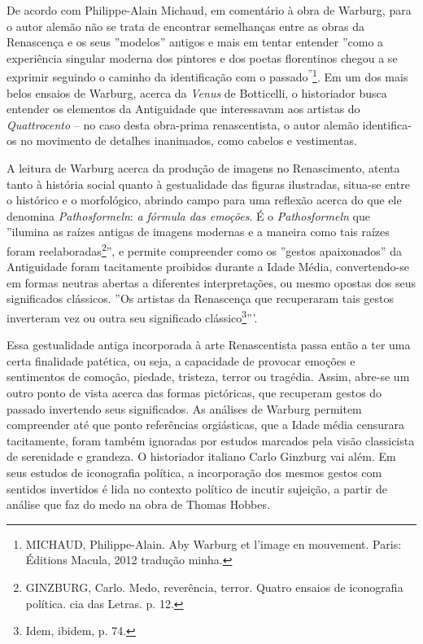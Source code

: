 De acordo com Philippe-Alain Michaud, em comentário à obra de Warburg,
para o autor alemão não se trata de encontrar semelhanças entre as obras
da Renascença e os seus ''modelos'' antigos e mais em tentar entender
''como a experiência singular moderna dos pintores e dos poetas
florentinos chegou a se exprimir seguindo o caminho da identificação com
o passado\textsuperscript{''}\footnote{MICHAUD, Philippe-Alain. Aby
  Warburg et l'image en mouvement. Paris: Éditions Macula, 2012 tradução
  minha.}. Em um dos mais belos ensaios de Warburg, acerca da
\emph{Venus} de Botticelli, o historiador busca entender os elementos da
Antiguidade que interessavam aos artistas do \emph{Quattrocento} -- no
caso desta obra-prima renascentista, o autor alemão identifica-os no
movimento de detalhes inanimados, como cabelos e vestimentas.

A leitura de Warburg acerca da produção de imagens no Renascimento,
atenta tanto à história social quanto à gestualidade das figuras
ilustradas, situa-se entre o histórico e o morfológico, abrindo campo
para uma reflexão acerca do que ele denomina \emph{Pathosformeln}:
\emph{a fórmula das emoções}. É o \emph{Pathosformeln} que ''ilumina as
raízes antigas de imagens modernas e a maneira como tais raízes foram
reelaboradas\footnote{GINZBURG, Carlo. Medo, reverência, terror. Quatro
  ensaios de iconografia política. cia das Letras. p. 12.}'', e permite
compreender como os ''gestos apaixonados'' da Antiguidade foram
tacitamente proibidos durante a Idade Média, convertendo-se em formas
neutras abertas a diferentes interpretações, ou mesmo opostas dos seus
significados clássicos. ''Os artistas da Renascença que recuperaram tais
gestos inverteram vez ou outra seu significado clássico\footnote{Idem,
  ibidem, p. 74.}'''.

Essa gestualidade antiga incorporada à arte Renascentista passa então a
ter uma certa finalidade patética, ou seja, a capacidade de provocar
emoções e sentimentos de comoção, piedade, tristeza, terror ou tragédia.
Assim, abre-se um outro ponto de vista acerca das formas pictóricas, que
recuperam gestos do passado invertendo seus significados. As análises de
Warburg permitem compreender até que ponto referências orgiásticas, que
a Idade média censurara tacitamente, foram também ignoradas por estudos
marcados pela visão classicista de serenidade e grandeza. O historiador
italiano Carlo Ginzburg vai além. Em seus estudos de iconografia
política, a incorporação dos mesmos gestos com sentidos invertidos é
lida no contexto político de incutir sujeição, a partir de análise que
faz do medo na obra de Thomas Hobbes.

